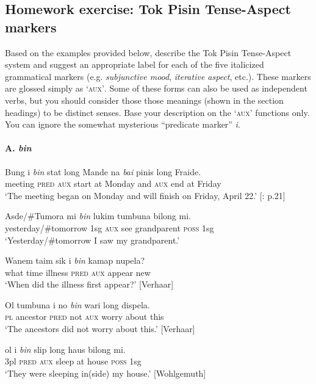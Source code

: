 \subsection*{Homework exercise: Tok Pisin Tense-Aspect markers} %

Based on the examples provided below, describe the Tok Pisin Tense-Aspect system and suggest an appropriate label for each of the five italicized grammatical markers (e.g. \textit{subjunctive mood}, \textit{iterative aspect}, etc.). These markers are glossed simply as ‘\textsc{aux’}. Some of these forms can also be used as independent verbs, but you should consider those those meanings (shown in the section headings) to be distinct senses. Base your description on the ‘\textsc{aux’} functions only. You can ignore the somewhat mysterious “predicate marker” \textit{i}.


\paragraph*{A. \textit{bin}}
\ea
\gll   Bung  i  \textit{bin}  stat  long  Mande  na  \textit{bai}  pinis  long  Fraide.\\
meeting  \textsc{pred}  \textsc{aux}  start  at  Monday  and  \textsc{aux}  end  at  Friday\\
\glt ‘The meeting began on Monday and will finish on Friday, April 22.’ [\citealt{Sebba1997}: p.21] 
\z

\ea
\gll  Asde/\#Tumora  mi  \textit{bin}  lukim  tumbuna  bilong  mi.\\
yesterday/\#tomorrow  1sg  \textsc{aux}  see  grandparent  \textsc{poss}  1sg\\
\glt ‘Yesterday/\#tomorrow I saw my grandparent.’
\z

\ea
\gll  Wanem  taim  sik  i  \textit{bin}  kamap  nupela?\\
what  time  illness  \textsc{pred}  \textsc{aux}  appear  new\\
\glt ‘When did the illness first appear?’  [Verhaar]
\z

\ea
\gll   Ol  tumbuna  i  no  \textit{bin}  wari  long  dispela.\\
\textsc{pl}  ancestor  \textsc{pred}  not  \textsc{aux}  worry  about  this\\
\glt ‘The ancestors did not worry about this.’  [Verhaar]
\z

\ea
\gll  ol  i  \textit{bin}  slip  long  haus  bilong  mi.\\
3pl  \textsc{pred}  \textsc{aux}  sleep  at  house  \textsc{poss}  1sg\\
\glt ‘They were sleeping in(side) my house.’  [Wohlgemuth]
\z

